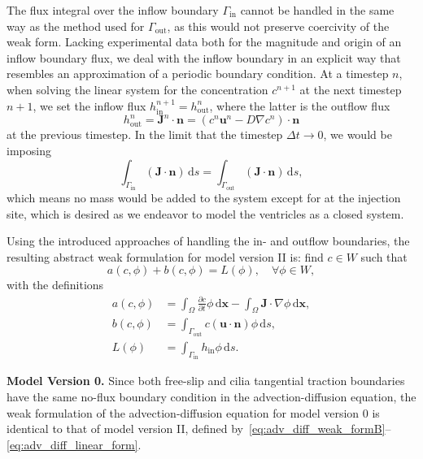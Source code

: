 \documentclass[fleqn]{wlscirep}
\newcommand{\pdifft}[1]{\frac{\partial  #1}{\partial t}}
\newcommand{\intO}[1]{\int_{\Omega}#1 \, \mathrm d\bm{x}}
\newcommand{\intGin}[1]{\int_{\Gamma_{\mathrm{in}}}#1 \, \mathrm ds}
\newcommand{\intGout}[1]{\int_{\Gamma_{\mathrm{out}}}#1 \, \mathrm ds}
\newcommand{\Gin}{\Gamma_{\mathrm{in}}}
\newcommand{\Gout}{\Gamma_{\mathrm{out}}}
\newcommand{\nn}{\mathbf{n}}
\newcommand{\uu}{\mathbf{u}}
\newcommand{\JJ}{\mathbf{J}}
\begin{document}
The flux integral over the inflow boundary $\Gin$ cannot be handled in the same way as the method used for $\Gout$, as this would not preserve coercivity of the weak form. Lacking experimental data both for the magnitude and origin of an inflow boundary flux, we deal with the inflow boundary in an explicit way that resembles an approximation of a periodic boundary condition. At a timestep $n$, when solving the linear system for the concentration $c^{n+1}$ at the next timestep $n+1$, we set the inflow flux $h_{\mathrm{in}}^{n+1} = h_{\mathrm{out}}^{n}$, where the latter is the outflow flux
\begin{equation*}
    h_{\mathrm{out}}^{n} = \JJ^n\cdot\nn = (c^n\uu^n - D\nabla c^n)\cdot\nn
\end{equation*}
at the previous timestep. In the limit that the timestep $\Delta t\to 0$, we would be imposing
\begin{equation*}
    \intGin{(\JJ\cdot\nn)} = \intGout{(\JJ\cdot\nn)},
\end{equation*}
which means no mass would be added to the system except for at the injection site, which is desired as we endeavor to model the ventricles as a closed system.

Using the introduced approaches of handling the in- and outflow boundaries, the resulting abstract weak formulation for model version II is: find $c\in W$ such that
\begin{equation}
    a(c, \phi) + b(c, \phi) = L(\phi), \quad\forall\phi\in W, \label{eq:adv_diff_weak_formB}
\end{equation}
with the definitions
\begin{align}
    a(c, \phi) &= \intO{\pdifft{c}\phi} - \intO{\JJ\cdot\nabla\phi}, \label{eq:adv_diff_bilinear_form}\\
    b(c, \phi) &= \intGout{c(\uu\cdot\nn)\phi}, \label{eq:adv_diff_skew_form} \\
    L(\phi) &= \intGin{h_{\mathrm{in}}\phi}.\label{eq:adv_diff_linear_form}
\end{align}

\textbf{Model Version 0.} Since both free-slip and cilia tangential traction boundaries have the same no-flux boundary condition in the advection-diffusion equation, the weak formulation of the advection-diffusion equation for model version 0 is identical to that of model version II, defined by~\eqref{eq:adv_diff_weak_formB}--\eqref{eq:adv_diff_linear_form}.
\end{document}
